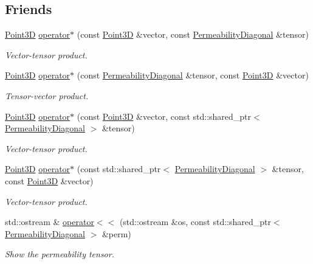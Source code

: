 \subsection*{Friends}
\begin{DoxyCompactItemize}
\item 
\hyperlink{classFVCode3D_1_1Point3D}{Point3D} \hyperlink{classFVCode3D_1_1PermeabilityDiagonal_a869e4cfa60e65cd7b9fe2020b793337a}{operator$\ast$} (const \hyperlink{classFVCode3D_1_1Point3D}{Point3D} \&vector, const \hyperlink{classFVCode3D_1_1PermeabilityDiagonal}{Permeability\+Diagonal} \&tensor)
\begin{DoxyCompactList}\small\item\em Vector-\/tensor product. \end{DoxyCompactList}\item 
\hyperlink{classFVCode3D_1_1Point3D}{Point3D} \hyperlink{classFVCode3D_1_1PermeabilityDiagonal_ac1a27e99db3612bb084ffbe41551de19}{operator$\ast$} (const \hyperlink{classFVCode3D_1_1PermeabilityDiagonal}{Permeability\+Diagonal} \&tensor, const \hyperlink{classFVCode3D_1_1Point3D}{Point3D} \&vector)
\begin{DoxyCompactList}\small\item\em Tensor-\/vector product. \end{DoxyCompactList}\item 
\hyperlink{classFVCode3D_1_1Point3D}{Point3D} \hyperlink{classFVCode3D_1_1PermeabilityDiagonal_a724a0b0ea3e14e6c7e2c62d885616ff2}{operator$\ast$} (const \hyperlink{classFVCode3D_1_1Point3D}{Point3D} \&vector, const std\+::shared\+\_\+ptr$<$ \hyperlink{classFVCode3D_1_1PermeabilityDiagonal}{Permeability\+Diagonal} $>$ \&tensor)
\begin{DoxyCompactList}\small\item\em Vector-\/tensor product. \end{DoxyCompactList}\item 
\hyperlink{classFVCode3D_1_1Point3D}{Point3D} \hyperlink{classFVCode3D_1_1PermeabilityDiagonal_a4f70197aef7b9798be848bb321fb1c95}{operator$\ast$} (const std\+::shared\+\_\+ptr$<$ \hyperlink{classFVCode3D_1_1PermeabilityDiagonal}{Permeability\+Diagonal} $>$ \&tensor, const \hyperlink{classFVCode3D_1_1Point3D}{Point3D} \&vector)
\begin{DoxyCompactList}\small\item\em Vector-\/tensor product. \end{DoxyCompactList}\item 
std\+::ostream \& \hyperlink{classFVCode3D_1_1PermeabilityDiagonal_a5574038bf711aa3afd05663761c39570}{operator$<$$<$} (std\+::ostream \&os, const std\+::shared\+\_\+ptr$<$ \hyperlink{classFVCode3D_1_1PermeabilityDiagonal}{Permeability\+Diagonal} $>$ \&perm)
\begin{DoxyCompactList}\small\item\em Show the permeability tensor. \end{DoxyCompactList}\end{DoxyCompactItemize}
